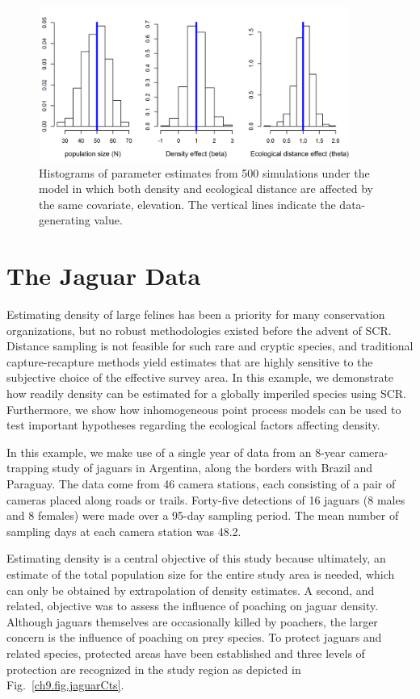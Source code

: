 \begin{figure}[ht]
\centering
\includegraphics[width=4in,height=2in]{Ch11/figs/scrDEDsim}
\caption{Histograms of parameter estimates from 500 simulations under
  the model in which both density and ecological distance are affected
by the same covariate, elevation. The vertical lines indicate the
data-generating value.}
\label{ch9.fig.sim}
\end{figure}




\section{The Jaguar Data}

Estimating density of large felines has been a priority for many
conservation organizations, but no robust methodologies existed before
the advent of SCR. Distance sampling is not feasible for such rare and
cryptic species, and traditional capture-recapture methods yield
estimates that are highly sensitive to the subjective choice of the
effective survey area. In this example, we
demonstrate how readily density can be estimated for a
globally imperiled species using SCR. Furthermore, we show how
inhomogeneous point process models can be used to test important
hypotheses regarding the ecological factors affecting density.

In this example, we make use of a single year of data from an 8-year
camera-trapping study of jaguars in Argentina,
along the borders with Brazil and Paraguay. The data come from 46
camera stations, each consisting of a pair of cameras placed along
roads or trails. Forty-five detections of 16 jaguars (8 males and 8
females) were made over a 95-day sampling period. The mean number of
sampling days at each camera station was 48.2.

Estimating density is a central objective of this study because
ultimately, an estimate of the total population size for the entire
study area is needed, which can only be obtained by extrapolation of
density estimates. A second, and related, objective was to assess
the influence of poaching on jaguar density. Although jaguars
themselves are occasionally killed by poachers, the larger concern is
the influence of poaching on prey species. To protect jaguars and
related species, protected areas have
been established and three levels of protection are
recognized in the study region as depicted in Fig.~\ref{ch9.fig.jaguarCts}.

